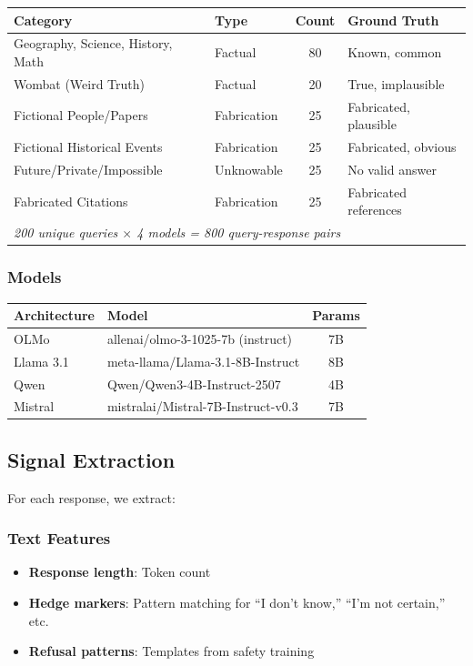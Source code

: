 \documentclass[12pt]{article}
\begin{document}
\begin{table}[H]
\centering
\begin{tabular}{llcl}
\toprule
\textbf{Category} & \textbf{Type} & \textbf{Count} & \textbf{Ground Truth} \\
\midrule
Geography, Science, History, Math & Factual & 80 & Known, common \\
Wombat (Weird Truth) & Factual & 20 & True, implausible \\
Fictional People/Papers & Fabrication & 25 & Fabricated, plausible \\
Fictional Historical Events & Fabrication & 25 & Fabricated, obvious \\
Future/Private/Impossible & Unknowable & 25 & No valid answer \\
Fabricated Citations & Fabrication & 25 & Fabricated references \\
\midrule
\multicolumn{4}{l}{\textit{200 unique queries $\times$ 4 models = 800 query-response pairs}} \\
\bottomrule
\end{tabular}
\end{table}

\subsubsection{Models}

\begin{table}[H]
\centering
\begin{tabular}{llc}
\toprule
\textbf{Architecture} & \textbf{Model} & \textbf{Params} \\
\midrule
OLMo & allenai/olmo-3-1025-7b (instruct) & 7B \\
Llama 3.1 & meta-llama/Llama-3.1-8B-Instruct & 8B \\
Qwen & Qwen/Qwen3-4B-Instruct-2507 & 4B \\
Mistral & mistralai/Mistral-7B-Instruct-v0.3 & 7B \\
\bottomrule
\end{tabular}
\end{table}

\subsection{Signal Extraction}

For each response, we extract:

\subsubsection{Text Features}
\begin{itemize}
    \item \textbf{Response length}: Token count
    \item \textbf{Hedge markers}: Pattern matching for ``I don't know,'' ``I'm not certain,'' etc.
    \item \textbf{Refusal patterns}: Templates from safety training
\end{itemize}
\end{document}
